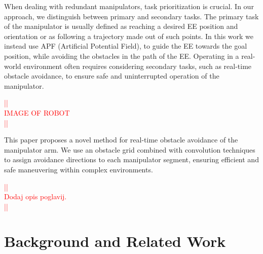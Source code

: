 \documentclass[a4paper]{article}
\newcommand\todocomment[1]{\textcolor{red}{||\\ #1\\||}}
\begin{document}
When dealing with redundant manipulators, task prioritization is crucial. In our approach, we distinguish between primary and secondary tasks. The primary task of the manipulator is usually defined as reaching a desired EE position and orientation or as following a trajectory made out of such points. In this work we instead use APF (Artificial Potential Field), to guide the EE towards the goal position, while avoiding the obstacles in the path of the EE. Operating in a real-world environment often requires considering secondary tasks, such as real-time obstacle avoidance, to ensure safe and uninterrupted operation of the manipulator.

\todocomment{IMAGE OF ROBOT}

This paper proposes a novel method for real-time obstacle avoidance of the manipulator arm. We use an obstacle grid combined with convolution techniques to assign avoidance directions to each manipulator segment, ensuring efficient and safe maneuvering within complex environments. 


\todocomment{Dodaj opis poglavij.}

\section{Background and Related Work}

%
%
%
\end{document}
